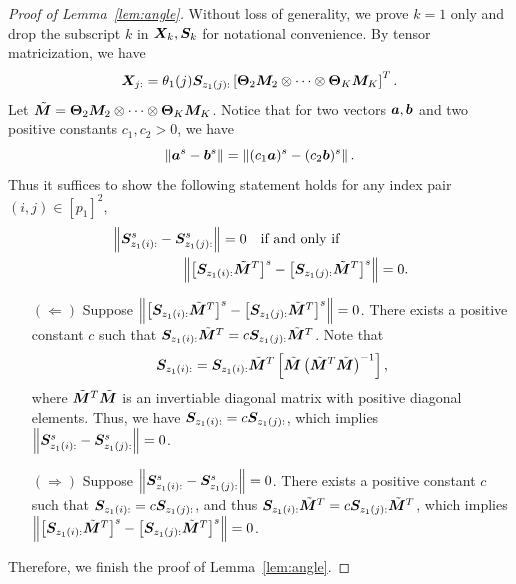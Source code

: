 \documentclass[journal]{IEEEtran}
\theoremstyle{definition}
\theoremstyle{definition}
\newcommand{\of}[1]{\left(#1\right)}
\newcommand{\off}[1]{\left[#1\right]}
\begin{document}
\begin{proof}[Proof of Lemma~\ref{lem:angle}] Without loss of generality, we prove $k = 1$ only and drop the subscript $k$ in $\bm X_k, \bm S_k$ for notational convenience. 
By tensor matricization, we have
\begin{equation}
    \mX_{j:} = \theta_1(j) \mS_{z_1(j):} \off{\mTheta_2 \mM_2 \otimes \cdots \otimes \mTheta_K \mM_K}^T.
\end{equation}     
Let $\tilde {\bm M} = \boldsymbol{\Theta}_2 \bm M_2 \otimes \cdots \otimes \boldsymbol{\Theta}_K \bm M_K$. Notice that for two vectors $\bm{a}, \bm{b}$ and two positive constants $c_1, c_2 >0$, we have
\begin{equation}
\left\lVert\bm{a}^s - \bm{b}^s\right\rVert = \left\lVert(c_1 \bm{a})^s - (c_2\bm{b})^s\right\rVert.
\end{equation}
Thus it suffices to show the following statement holds for any index pair $(i,j)\in[p_1]^2$,
\begin{align}
    &\onorm{ \mS_{z_1(i):}^s - \mS_{z_1(j):}^s} = 0 \quad \text{if and only if} \\
    & \quad \quad \quad \quad \quad \onorm{ \off{\mS_{z_1(i):} \tilde \mM^T }^s - \off{\mS_{z_1(j):}\tilde \mM^T}^s} = 0.
\end{align}
\begin{enumerate}[wide]
    \item[$(\Leftarrow)$] Suppose $\onorm{ \off{\mS_{z_1(i):} \tilde \mM^T }^s - \off{\mS_{z_1(j):}\tilde \mM^T}^s} = 0$. There exists a positive constant $c$ such that $\bm S_{z_1(i):} \tilde {\bm M}^T= c \bm S_{z_1(j):} \tilde {\bm M}^T$. Note that
\begin{equation}
    \mS_{z_1(i):} = \mS_{z_1(i):} \tilde \mM^T \off{ \tilde \mM \of{ \tilde \mM^T  \tilde \mM}^{-1}},
\end{equation}
where $ \tilde {\bm M}^T  \tilde {\bm M}$ is an invertiable diagonal matrix with positive diagonal elements. Thus, we have $ \bm S_{z_1(i):} = c  \bm S_{z_1(j):}$, which implies $ \left\lVert  \bm S_{z_1(i):}^s -  \bm S_{z_1(j):}^s \right\rVert = 0 $.

\item[$(\Rightarrow)$] Suppose $ \left\lVert \bm S_{z_1(i):}^s - \bm S_{z_1(j):}^s \right\rVert = 0 $. There exists a positive constant $c$ such that $\bm S_{z_1(i):} = c \bm S_{z_1(j):}$, and thus $\bm S_{z_1(i):} \tilde {\bm M}^T = c \bm S_{z_1(j):} \tilde {\bm M}^T$, which implies $\left\lVert\left[\bm S_{z_1(i):} \tilde {\bm M}^T\right]^s- \left[\bm S_{z_1(j):} \tilde {\bm M}^T\right]^s\right\rVert=0$.
\end{enumerate}
Therefore, we finish the proof of Lemma~\ref{lem:angle}.
\end{proof}
\end{document}
